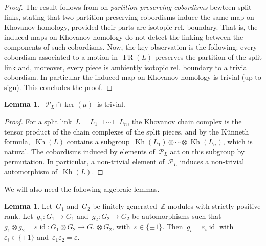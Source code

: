 \documentclass{amsart}
\theoremstyle{definition}
\theoremstyle{definition}
\theoremstyle{definition}
\theoremstyle{definition}
\newtheorem{lemma}[theorem]{Lemma}
\DeclareMathOperator{\id}{id}
\newcommand{\Z}{\mathbb{Z}}
\newcommand{\calP}{\mathcal{P}} %
\DeclareMathOperator{\Kh}{Kh}
\DeclareMathOperator{\FR}{FR}
\begin{document}
\begin{proof}
     The result follows from \cite[Theorem 1.2]{Gujral-Levine} on \emph{partition-preserving cobordisms} bewteen split links, stating that two partition-preserving cobordisms induce the same map on Khovanov homology, provided their parts are isotopic rel. boundary. That is, the induced maps on Khovanov homology do not detect the linking between the components of such cobordisms. Now, the key observation is the following: every cobordism associated to a motion in~$\FR(L)$ preserves the partition of the split link and, moreover, every piece is ambiently isotopic rel. boundary to a trivial cobordism. In particular the induced map on Khovanov homology is trivial (up to sign). This concludes the proof.
\end{proof}
 
 \begin{lemma} \label{lem:intersection_symmetric}
    ~$\calP_L \cap \ker (\mu)~$ is trivial.
 \end{lemma}
 \begin{proof}
     For a split link~$L = L_1 \sqcup \cdots \sqcup L_n$, the Khovanov chain complex is the tensor product of the chain complexes of the split pieces, and by the K\"unneth formula,~$\Kh(L)$ contains a subgroup~$\Kh(L_1) \otimes \cdots \otimes \Kh(L_n)$, which is natural. The cobordisms induced by elements of~$\calP_L$ act on this subgroup by permutation. In particular, a non-trivial element of~$\calP_L$ induces a non-trivial automorphism of~$\Kh(L)$.
 \end{proof}

We will also need the following algebraic lemmas.

 \begin{lemma}\label{lem:reduction_to_tensors}
     Let~$G_1$ and~$G_2$ be finitely generated~$\Z$-modules with strictly positive rank. Let~$g_1 \colon G_1\rightarrow G_1$ and~$g_2 \colon G_2\rightarrow G_2$ be automorphisms such that~$g_1 \otimes g_2 = \varepsilon \id \colon G_1 \otimes G_2 \rightarrow G_1 \otimes G_2$, with~$\varepsilon\in \{\pm 1\}$. Then~$g_i = \varepsilon_i \id$ with~$\varepsilon_i \in \{\pm 1\}$ and~$\varepsilon_1 \varepsilon_2 = \varepsilon$.
 \end{lemma}
\end{document}

